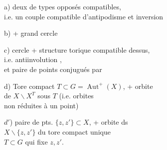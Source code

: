 a) deux  de types opposés compatibles,\\
i.e. un couple compatible d'antipodisme et inversion

b)   + grand cercle

c) cercle + structure torique compatible dessus,\\
i.e. antiinvolution ,\\
et paire de points conjugués par\\

d) Tore compact $T\subset G=\operatorname{Aut}^+(X)$, + orbite\\
de $X\backslash X^T$ sous $T$ (i.e. orbites\\
non réduites à un point)

$d'$) paire de pts. $\{z,z'\}\subset X$, + orbite ds\\
$X\backslash\{z,z'\}$ du tore compact unique\\
$T\subset G$ qui fixe $z,z'$.
